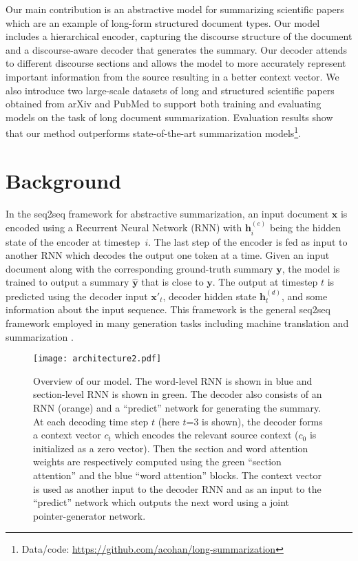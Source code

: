 \documentclass[11pt,a4paper]{article}
\newcommand{\V}[1][\mathbf]{#1}
\newcommand{\encstate}[1]{\mathbf{h}_{#1}^{(e)}}
\newcommand{\decstate}[1]{\mathbf{h}_{#1}^{(d)}}
\begin{document}
Our main contribution is an abstractive model for summarizing scientific papers which are an example of long-form structured document types. Our model includes a hierarchical encoder, capturing the discourse structure of the document and a discourse-aware decoder that generates the summary. Our decoder attends to different discourse sections and allows the model to more accurately represent important information from the source resulting in a better context vector.
We also introduce two large-scale datasets of long and structured scientific papers obtained from arXiv and PubMed to support both training and evaluating models on the task of long document summarization. Evaluation results show that our method outperforms state-of-the-art summarization models\footnote{\small {} Data/code: \url{https://github.com/acohan/long-summarization}}.


\section{Background}

In the seq2seq framework for abstractive summarization, an input document $\V{x}$ is encoded using a Recurrent Neural Network (RNN) with $\encstate{i}$ being the hidden state of the encoder at timestep~$i$. The last step of the encoder is fed as input to another RNN which decodes the output one token at a time. Given an input document along with the corresponding ground-truth summary $\V{y}$, the model is trained to output a summary $\hat{\V{y}}$ that is close to $\V{y}$. The output at timestep $t$ is predicted using the decoder input $\V{x}'_t$, decoder hidden state $\decstate{t}$, and some information about the input sequence. This framework is the general seq2seq framework employed in many generation tasks including machine translation \cite{sutskever2014sequence,bahdanau2014neural} and summarization \cite{nallapati2016abstractive,chopra2016abstractive}.

\begin{figure}[t]
\centering
\texttt{[image: architecture2.pdf]}
\caption{Overview of our model.
The word-level RNN is shown in blue and section-level RNN is shown in green. The decoder also consists of an RNN (orange) and a ``predict'' network for generating the summary. At each decoding time step $t$ (here $t$=$3$ is shown), the decoder forms a context vector $c_t$ which encodes the relevant source context ($c_0$ is initialized as a zero vector).
Then the section and word attention weights are respectively computed using the green ``section attention'' and the blue ``word attention'' blocks.
The context vector is used as another input to the decoder RNN and as an input to the ``predict'' network which outputs the next word using a joint pointer-generator network.
}
\label{fig:arch}
\end{figure}
\end{document}
